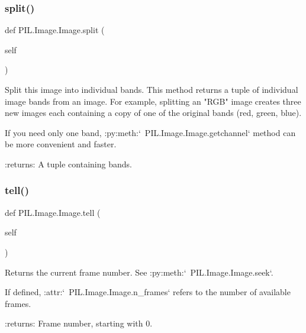 \subsubsection{\texorpdfstring{split()}{split()}}
{\footnotesize\ttfamily def P\+I\+L.\+Image.\+Image.\+split (\begin{DoxyParamCaption}\item[{}]{self }\end{DoxyParamCaption})}

\begin{DoxyVerb}Split this image into individual bands. This method returns a
tuple of individual image bands from an image. For example,
splitting an "RGB" image creates three new images each
containing a copy of one of the original bands (red, green,
blue).

If you need only one band, :py:meth:`~PIL.Image.Image.getchannel`
method can be more convenient and faster.

:returns: A tuple containing bands.
\end{DoxyVerb}
 \mbox{\label{classPIL_1_1Image_1_1Image_ab9cf79bf2f3587eeafb45d6c60068f24}} 
\subsubsection{\texorpdfstring{tell()}{tell()}}
{\footnotesize\ttfamily def P\+I\+L.\+Image.\+Image.\+tell (\begin{DoxyParamCaption}\item[{}]{self }\end{DoxyParamCaption})}

\begin{DoxyVerb}Returns the current frame number. See :py:meth:`~PIL.Image.Image.seek`.

If defined, :attr:`~PIL.Image.Image.n_frames` refers to the
number of available frames.

:returns: Frame number, starting with 0.
\end{DoxyVerb}
 \mbox{\label{classPIL_1_1Image_1_1Image_a66e41b966325017a5322fb48eedacc13}} 

